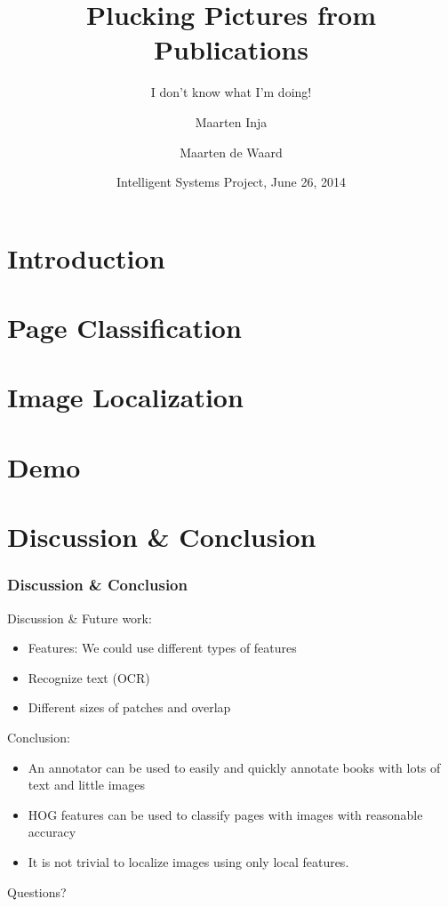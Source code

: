 \documentclass{beamer}
\title{Plucking Pictures from Publications}
\subtitle{I don't know what I'm doing!}
\author{Maarten Inja \and Maarten de Waard}
\institute[UvA]{University of Amsterdam}
\date[2014]{Intelligent Systems Project, June 26, 2014}
\newcommand{\slide}[2]
{
\begin{frame}
\frametitle{#1} 

#2

\end{frame}
}
\begin{document}
\begin{frame}
\titlepage
\end{frame}

\section{Introduction}


\section{Page Classification}


\section{Image Localization}




\section{Demo}


\section{Discussion \& Conclusion} 

\slide{Discussion \& Conclusion}
{
	Discussion \& Future work:
	\begin{itemize}
		\item Features: We could use different types of features 
		\item Recognize text (OCR)
		\item Different sizes of patches and overlap
	\end{itemize}
	Conclusion:
	\begin{itemize}
		\item An annotator can be used to easily and quickly annotate books with
		lots of text and little images
		\item HOG features can be used to classify pages with images with
		reasonable accuracy
		\item It is not trivial to localize images using only local features.
	\end{itemize}
}
%         
%         

\begin{frame}
Questions?
\end{frame}
\end{document}
